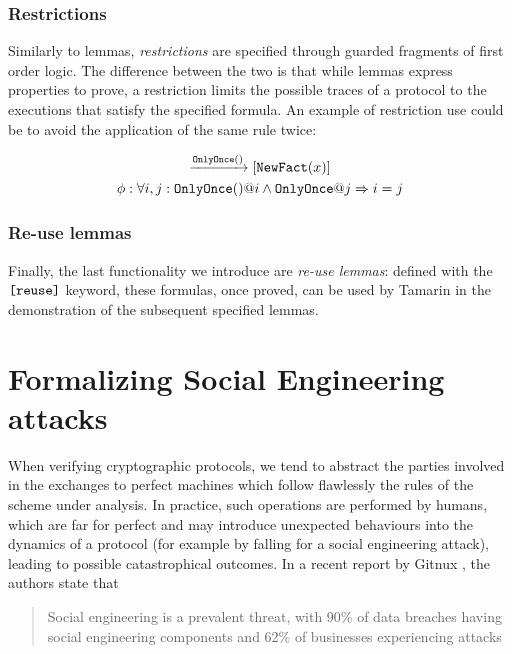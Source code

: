 \documentclass{article}
\newcommand{\mono}[1]{\textrm{\tt #1}}
\begin{document}
\subsubsection{Restrictions}

Similarly to lemmas, \textit{restrictions} are specified through guarded fragments of first order logic. The difference between the two is that while lemmas express properties to prove, a restriction limits the possible traces of a protocol to the executions that satisfy the specified formula. An example of restriction use could be to avoid the application of the same rule twice:

\begin{gather*}
    [\mono{OldFact}(x)] \xrightarrow{\mono{OnlyOnce}()} [\mono{NewFact}(x)]\\
    \phi : \forall i,j : \mono{OnlyOnce}() @ i \land \mono{OnlyOnce} @ j \Rightarrow i = j
\end{gather*}

\subsubsection{Re-use lemmas}

Finally, the last functionality we introduce are \textit{re-use lemmas}: defined with the $\mono{[reuse]}$ keyword, these formulas, once proved, can be used by Tamarin in the demonstration of the subsequent specified lemmas.


\section{Formalizing Social Engineering attacks}\label{sec:SocialEngineering}

When verifying cryptographic protocols, we tend to abstract the parties involved in the exchanges to perfect machines which follow flawlessly the rules of the scheme under analysis. In practice, such operations are performed by humans, which are far for perfect and may introduce unexpected behaviours into the dynamics of a protocol (for example by falling for a social engineering attack), leading to possible catastrophical outcomes. In a recent report by Gitnux \cite{Gitnux_2023}, the authors state that

\begin{quote} Social engineering is a prevalent threat, with 90\% of data breaches having social engineering components and 62\% of businesses experiencing attacks \end{quote}
\end{document}
